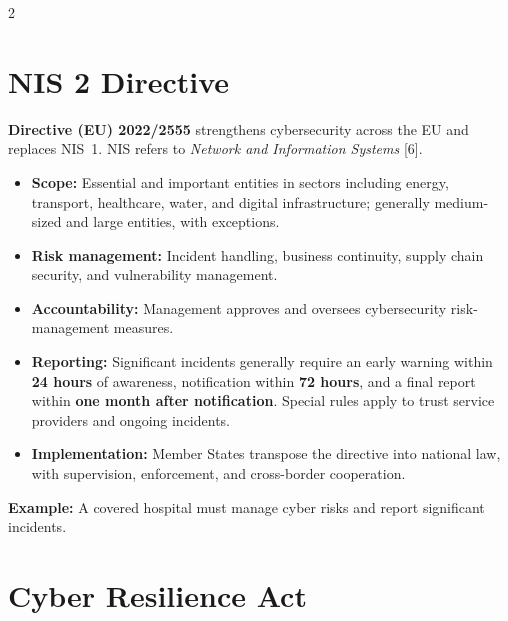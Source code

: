 \documentclass[11pt,a4paper]{article}
\begin{document}
\begin{multicols}{2}
\raggedcolumns

\section{NIS 2 Directive}

\textbf{Directive (EU) 2022/2555} strengthens cybersecurity
across the EU and replaces NIS~1. NIS refers to
\textit{Network and Information Systems} [6].
\begin{itemize}
\item \textbf{Scope:} Essential and important entities in
sectors including energy, transport, healthcare, water,
and digital infrastructure; generally medium-sized and
large entities, with exceptions.
\item \textbf{Risk management:} Incident handling, business
continuity, supply chain security, and vulnerability management.
\item \textbf{Accountability:} Management approves and
oversees cybersecurity risk-management measures.
\item \textbf{Reporting:} Significant incidents generally
require an early warning within \textbf{24 hours} of awareness,
notification within \textbf{72 hours}, and a final report
within \textbf{one month after notification}. Special rules
apply to trust service providers and ongoing incidents.
\item \textbf{Implementation:} Member States transpose
the directive into national law, with supervision,
enforcement, and cross-border cooperation.
\end{itemize}
\textbf{Example:} A covered hospital must manage cyber risks
and report significant incidents.

\section{Cyber Resilience Act}


\end{multicols}
\end{document}
